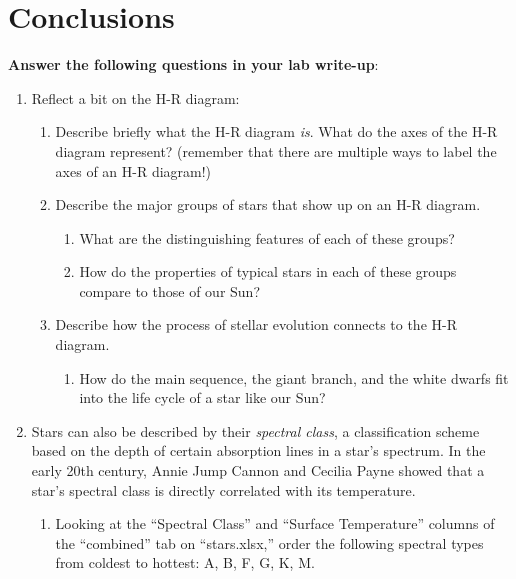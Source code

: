 \documentclass[11pt]{article}
\begin{document}
\section{Conclusions}
\textbf{Answer the following questions in your lab write-up}:
\begin{enumerate}
    \item Reflect a bit on the H-R diagram:
    \begin{enumerate}
        \item Describe briefly what the H-R diagram \emph{is}. What do the axes of the H-R diagram represent? (remember that there are multiple ways to label the axes of an H-R diagram!)
        
        \item Describe the major groups of stars that show up on an H-R diagram. 
        \begin{enumerate}
            \item What are the distinguishing features of each of these groups?
            
            \item How do the properties of typical stars in each of these groups compare to those of our Sun?
        \end{enumerate} 
        
        \item Describe how the process of stellar evolution connects to the H-R diagram.
        \begin{enumerate}
            \item How do the main sequence, the giant branch, and the white dwarfs fit into the life cycle of a star like our Sun?
        \end{enumerate}
        
    \end{enumerate}
    
    \item Stars can also be described by their \emph{spectral class}, a classification scheme based on the depth of certain absorption lines in a star's spectrum. In the early 20th century, Annie Jump Cannon and Cecilia Payne showed that a star's spectral class is directly correlated with its temperature.
    \begin{enumerate}
        \item Looking at the ``Spectral Class'' and ``Surface Temperature'' columns of the ``combined'' tab on ``stars.xlsx,'' order the following spectral types from coldest to hottest: A, B, F, G, K, M.
        

\end{enumerate}
\end{enumerate}
\end{document}
